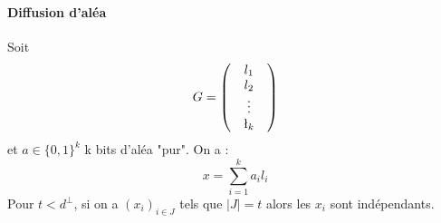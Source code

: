 \documentclass[12pt,a4paper]{report}
\begin{document}
\paragraph{Diffusion d'aléa\\}
Soit 
$$ G = \begin{pmatrix}
& l_1 &  \\
& l_2 & \\
& \vdots & \\
& \l_k & \end{pmatrix}$$
et $a \in \{0,1\}^k$ k bits d'aléa "pur". On a :
$$ x = \sum_{i=1}^k a_i l_i $$
Pour $t < d^{\perp}$, si on a $ (x_i)_{i \in J}$ tels que $|J| = t$ alors les $x_i$ sont indépendants.
\end{document}
